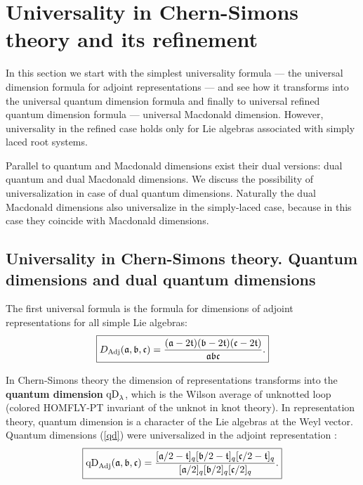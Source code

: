 \documentclass{article}
\def\qD{\hbox{qD}}
\def\qD{\hbox{qD}}
\begin{document}
\section{Universality in Chern-Simons theory and its refinement \label{UniSec}}

In this section we start with the simplest universality formula --- the universal dimension formula for adjoint representations --- and see how it transforms into the universal quantum dimension formula and finally to universal refined quantum dimension formula --- universal Macdonald dimension. However, universality in the refined case holds only for Lie algebras associated with simply laced root systems.

Parallel to quantum and Macdonald dimensions exist their dual versions: dual quantum and dual Macdonald dimensions. We discuss the possibility of universalization in case of dual quantum dimensions. Naturally the dual Macdonald dimensions also universalize in the simply-laced case, because in this case they coincide with Macdonald dimensions.

\subsection{\label{UniCS}Universality in Chern-Simons theory. Quantum dimensions and dual quantum dimensions}

The first universal formula is the formula for dimensions of adjoint representations \cite{Vogel95} for all simple Lie algebras:
\begin{equation}
\boxed{
  D_{\text{Adj}}(\mathfrak{a},\mathfrak{b},\mathfrak{c})  = {(\mathfrak{a} - 2\mathfrak{t})(\mathfrak{b} - 2\mathfrak{t})(\mathfrak{c} - 2\mathfrak{t})\over\mathfrak{a}\mathfrak{b}\mathfrak{c}}.
  }
\end{equation}

\vspace{10pt}
In Chern-Simons theory the dimension of representations transforms into the {\bf quantum dimension} $\qD_{\lambda}$, which is the Wilson average of unknotted loop (colored HOMFLY-PT invariant of the unknot in knot theory). In representation theory, quantum dimension is a character of the Lie algebras at the Weyl vector. Quantum dimensions (\ref{qd}) were universalized in the adjoint representation \cite{Westbury03, MkrtQDims}:
\begin{align}
\boxed{
        \qD_{\text{Adj}}(\mathfrak{a},\mathfrak{b},\mathfrak{c}) ={[\mathfrak{a}/2 - \mathfrak{t}]_q[\mathfrak{b}/2 - \mathfrak{t}]_q[\mathfrak{c}/2 - \mathfrak{t}]_q\over[\mathfrak{a}/2]_q[\mathfrak{b}/2]_q[\mathfrak{c}/2]_q}.
        }
 \label{uniQdim}
    \end{align}
\end{document}
